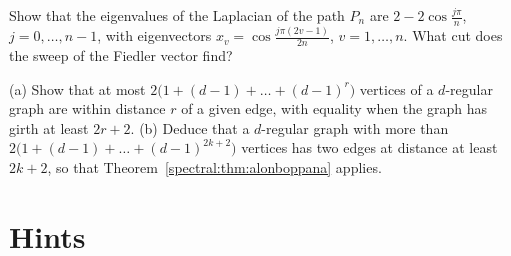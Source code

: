 \begin{exercise}[$\star\star$]\label{spectral:ex:fiedlerpath}
Show that the eigenvalues of the Laplacian of the path $P_n$ are $2-2\cos\frac{j\pi}n$, $j=0,\dots,n-1$, with eigenvectors $x_v=\cos\frac{j\pi(2v-1)}{2n}$, $v=1,\dots,n$. What cut does the sweep of
the Fiedler vector find?
\end{exercise}

\begin{exercise}[$\star$]\label{spectral:ex:moorebound}
(a) Show that at most $2\bigl(1+(d-1)+\dots+(d-1)^r\bigr)$ vertices of a $d$-regular graph are within distance $r$ of a given edge, with equality when the graph has girth at least $2r+2$.
(b) Deduce that a $d$-regular graph with more than $2\bigl(1+(d-1)+\dots+(d-1)^{2k+2}\bigr)$ vertices has two edges at distance at least $2k+2$, so that Theorem~\ref{spectral:thm:alonboppana} applies.
\end{exercise}

\section{Hints}

